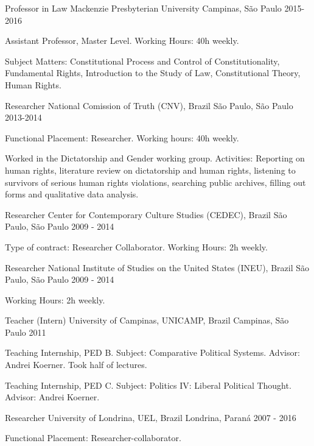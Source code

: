
\begin{cventries}

\cventry
{Professor in Law}
{Mackenzie Presbyterian University}
{Campinas, São Paulo}
{2015-2016}
{
\begin{cvitems}
  \item Assistant Professor, Master Level. Working Hours: 40h weekly.
  \item Subject Matters: Constitutional Process and Control of Constitutionality, Fundamental Rights, Introduction to the Study of Law, Constitutional Theory, Human Rights.
\end{cvitems}
}

\cventry
{Researcher}
{National Comission of Truth (CNV), Brazil}
{São Paulo, São Paulo}
{2013-2014}
{
\begin{cvitems}
  \item Functional Placement: Researcher. Working hours: 40h weekly.
  \item Worked in the Dictatorship and Gender working group. Activities: Reporting on human rights, literature review on dictatorship and human rights, listening to survivors of serious human rights violations, searching public archives, filling out forms and qualitative data analysis.
\end{cvitems}
}

\cventry
{Researcher}
{Center for Contemporary Culture Studies (CEDEC), Brazil}
{São Paulo, São Paulo}
{2009 - 2014}
{
\begin{cvitems}
  \item Type of contract: Researcher Collaborator. Working Hours: 2h weekly.
\end{cvitems}
}

\cventry
{Researcher}
{National Institute of Studies on the United States (INEU), Brazil}
{São Paulo, São Paulo}
{2009 - 2014}
{
\begin{cvitems}
  \item Working Hours: 2h weekly.
\end{cvitems}
}

\cventry
{Teacher (Intern)}
{University of Campinas, UNICAMP, Brazil}
{Campinas, São Paulo}
{2011}
{
\begin{cvitems}
  \item Teaching Internship, PED B. Subject: Comparative Political Systems. Advisor: Andrei Koerner. Took half of lectures.
  \item Teaching Internship, PED C. Subject: Politics IV: Liberal Political Thought. Advisor: Andrei Koerner.
\end{cvitems}
}

\cventry
{Researcher}
{University of Londrina, UEL, Brazil}
{Londrina, Paraná}
{2007 - 2016}
{
\begin{cvitems}
  \item Functional Placement: Researcher-collaborator.
\end{cvitems}
}

\end{cventries}
